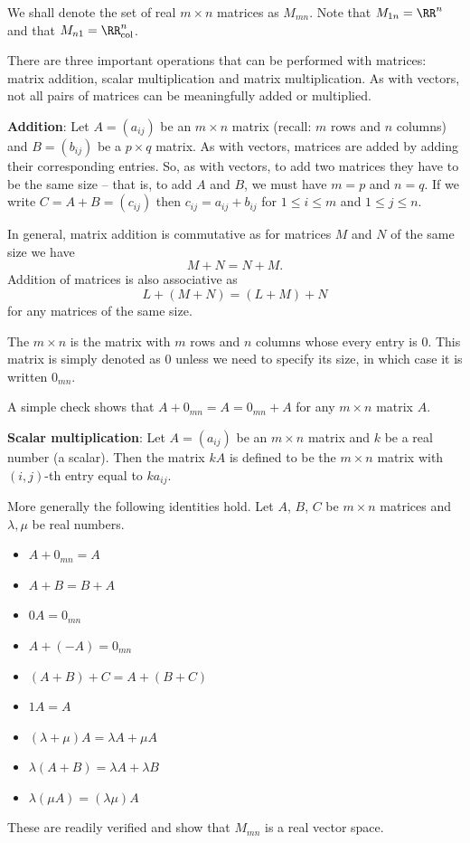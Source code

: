 \begin{notation}
We shall denote the set of real $m\times n$ matrices as $M_{mn}$. Note that $M_{1n}=\RR^n$ and that $M_{n1}=\RR^n_\text{col}$.
\end{notation}

There are three important operations that can be performed with matrices: matrix addition, scalar multiplication and matrix multiplication. As with vectors, not all pairs of matrices can be meaningfully added or multiplied.

\textbf{Addition}: Let $A=(a_{ij})$ be an $m\times n$ matrix (recall: $m$ rows and $n$ columns) and $B=(b_{ij})$ be a $p\times q$ matrix. As with vectors, matrices are added by adding their corresponding entries. So, as with vectors, to add two matrices they have to be the same size -- that is, to add $A$ and $B$, we must have $m=p$ and $n=q$. If we write $C=A+B=(c_{ij})$ then $c_{ij}=a_{ij}+b_{ij}$ for $1\le i\le m$ and $1\le j\le n$.

In general, matrix addition is commutative as for matrices $M$ and $N$ of the same size we have
\[ M+N=N+M. \]
Addition of matrices is also associative as
\[ L+(M+N)=(L+M)+N \]
for any matrices of the same size.

\begin{definition}
The $m\times n$  is the matrix with $m$ rows and $n$ columns whose every entry is $0$. This matrix is simply denoted as $0$ unless we need to specify its size, in which case it is written $0_{mn}$.
\end{definition}

A simple check shows that $A+0_{mn}=A=0_{mn}+A$ for any $m\times n$ matrix $A$.

\textbf{Scalar multiplication}: Let $A=(a_{ij})$ be an $m\times n$ matrix and $k$ be a real number (a scalar). Then the matrix $kA$ is defined to be the $m\times n$ matrix with $(i,j)$-th entry equal to $ka_{ij}$.

More generally the following identities hold. Let $A$, $B$, $C$ be $m\times n$ matrices and $\lambda,\mu$ be real numbers.
\begin{itemize}
\item $A+0_{mn}=A$
\item $A+B=B+A$
\item $0A=0_{mn}$
\item $A+(-A)=0_{mn}$
\item $(A+B)+C=A+(B+C)$
\item $1A=A$
\item $(\lambda+\mu)A=\lambda A+\mu A$
\item $\lambda(A+B)=\lambda A+\lambda B$
\item $\lambda(\mu A)=(\lambda\mu)A$
\end{itemize}
These are readily verified and show that $M_{mn}$ is a real vector space.

